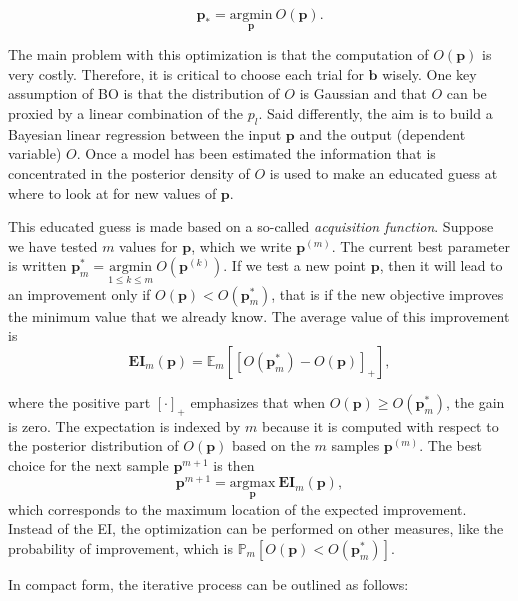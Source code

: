 \documentclass[]{krantz}
\theoremstyle{definition}
\theoremstyle{definition}
\theoremstyle{definition}
\theoremstyle{remark}
\begin{document}
\begin{equation}
\label{eq:HPO}
\textbf{p}_*=\underset{\textbf{p}}{\text{argmin}} \ O(\textbf{p}).
\end{equation}

The main problem with this optimization is that the computation of
\(O(\textbf{p})\) is very costly. Therefore, it is critical to choose
each trial for \(\textbf{b}\) wisely. One key assumption of BO is that
the distribution of \(O\) is Gaussian and that \(O\) can be proxied by a
linear combination of the \(p_l\). Said differently, the aim is to build
a Bayesian linear regression between the input \(\textbf{p}\) and the
output (dependent variable) \(O\). Once a model has been estimated the
information that is concentrated in the posterior density of \(O\) is
used to make an educated guess at where to look at for new values of
\(\textbf{p}\).

This educated guess is made based on a so-called \emph{acquisition
function}. Suppose we have tested \(m\) values for \(\textbf{p}\), which
we write \(\textbf{p}^{(m)}\). The current best parameter is written
\(\textbf{p}_m^*=\underset{1\le k\le m}{\text{argmin}} \ O(\textbf{p}^{(k)})\).
If we test a new point \(\textbf{p}\), then it will lead to an
improvement only if \(O(\textbf{p})<O(\textbf{p}_m^*)\), that is if the
new objective improves the minimum value that we already know. The
average value of this improvement is \begin{equation}
\label{eq:acquisition}
\textbf{EI}_m(\textbf{p})=\mathbb{E}_m[[O(\textbf{p}_m^*)-O(\textbf{p})]_+],
\end{equation}

where the positive part \([\cdot]_+\) emphasizes that when
\(O(\textbf{p})\ge O(\textbf{p}_m^*)\), the gain is zero. The
expectation is indexed by \(m\) because it is computed with respect to
the posterior distribution of \(O(\textbf{p})\) based on the \(m\)
samples \(\textbf{p}^{(m)}\). The best choice for the next sample
\(\textbf{p}^{m+1}\) is then \begin{equation}
\label{eq:EI}
\textbf{p}^{m+1}=\underset{\textbf{p}}{\text{argmax}} \ \textbf{EI}_m(\textbf{p}),
\end{equation} which corresponds to the maximum location of the expected
improvement. Instead of the EI, the optimization can be performed on
other measures, like the probability of improvement, which is
\(\mathbb{P}_m[O(\textbf{p})<O(\textbf{p}_m^*)]\).

In compact form, the iterative process can be outlined as follows:
\end{document}
